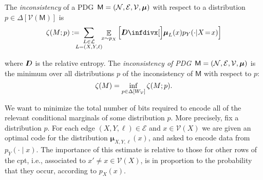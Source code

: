 \documentclass{article}
\def\sheq{\!=\!}
\newcommand{\bmu}{\boldsymbol{\mu}}
\newcommand{\V}{\mathcal V}
\newcommand{\Ed}{\mathcal E}
\newcommand{\sfM}{\mathsf M}
\newcommand{\MN}{PDG}
\numberwithin{equation}{section}
\begin{document}
	\begin{defn}\label{def:zeta-score}
       	  The \emph{inconsistency} of a \MN\ $\sfM = \mnvars[]$ with respect to a distribution $p \in \Delta[\V(\sfM)]$ is 
		\[
			\zeta(M ; p) := %
			\!\!\!\!\!\sum_{\substack{L \in \cal L\\L = (X,Y, \ell)}}\!\! \mathop{\mathbb E}_{x \sim p_X} \left[\kldiv[\Big]{\bmu_{L}(x) }{ p_Y(\cdot | X \sheq x) } \right]
		\]

		where $I\mkern-8muD$ is the relative entropy.
        The \emph{inconsistency of \MN\ $\sfM = \mnvars[]$} is the minimum over all distributions $p$ of the inconsistency of $\sfM$ with respect to $p$:
		\[ \zeta(M) = \inf_{ p \in \Delta [W_{\cal V}]}
\zeta (M; p) . \]
        \end{defn}

 	We want to minimize the total number of bits required to
        encode all of the relevant conditional marginals of some
        distribution $p$.  
 	More precisely, fix a distribution $p$. For each edge $(X, Y,
        \ell) \in \Ed$ and $x \in \V(X)$ we are given an optimal code
        for the distribution $\bmu_{X,Y,\ell}(x)$, and asked to encode
        data from $p_Y( \cdot \mid x)$.
        The importance of this
        estimate is relative to those for other rows of the cpt, i.e.,
        associated to $x' \neq x \in \V(X)$, is in proportion to the
        probability that they occur, according to $p_X(x)$. 
 		
\end{document}
